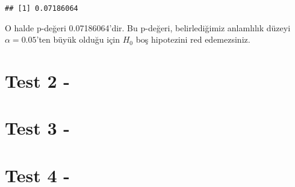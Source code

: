 \documentclass[
  12pt,
]{book}
\begin{document}
\begin{verbatim}
## [1] 0.07186064
\end{verbatim}

O halde p-değeri 0.07186064'dir. Bu p-değeri, belirlediğimiz anlamlılık düzeyi \(\alpha = 0.05\)'ten büyük olduğu için \(H_{0}\) boş hipotezini red edemezsiniz.

\hypertarget{test-2--}{%
\section{Test 2 -}\label{test-2--}}

\hypertarget{test-3--}{%
\section{Test 3 -}\label{test-3--}}

\hypertarget{test-4--}{%
\section{Test 4 -}\label{test-4--}}

  
\end{document}
